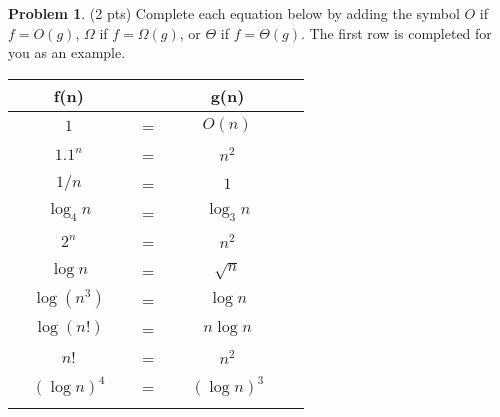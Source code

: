 \documentclass[12pt]{article}
\theoremstyle{definition}
\newtheorem{problem}{Problem}
\begin{document}
\newpage
\begin{problem}
(2 pts)
    Complete each equation below by adding the symbol $O$ if $f=O(g)$, $\Omega$ if $f=\Omega(g)$, or $\Theta$ if $f=\Theta(g)$.  
    The first row is completed for you as an example.

{\renewcommand{\arraystretch}{3.4}
\begin{tabular}{c c c c c c}
    & f(n) &~\hspace{0.5in}~$ $~\hspace{0.5in}~& g(n) &\\
    \hline
    & $1$ & ~\hspace{0.5in}~$=$~\hspace{0.5in}~  & $O(n)$ &  &\\
    \arrayrulecolor{gray}\hline
    & $1.1^n$ & ~\hspace{0.5in}~$=$~\hspace{0.5in}~  & $n^2$ &  &\\
    \arrayrulecolor{gray}\hline
    & $1/n$ & ~\hspace{0.5in}~$=$~\hspace{0.5in}~  & $1$ &  &\\
    \arrayrulecolor{gray}\hline
    & $\log_4 n$ & ~\hspace{0.5in}~$=$~\hspace{0.5in}~  & $\log_3 n$ &  &\\
    \arrayrulecolor{gray}\hline
    & $2^{n}$ & ~\hspace{0.5in}~$=$~\hspace{0.5in}~  & $n^2$ &  &\\
    \arrayrulecolor{gray}\hline
    & $\log n$ & ~\hspace{0.5in}~$=$~\hspace{0.5in}~  & $\sqrt n$ &  &\\
    \arrayrulecolor{gray}\hline
    & $\log (n^3)$ & ~\hspace{0.5in}~$=$~\hspace{0.5in}~  & $\log n$ &  &\\
    \arrayrulecolor{gray}\hline
    & $\log (n!)$ & ~\hspace{0.5in}~$=$~\hspace{0.5in}~  & $n\log n$ &  &\\
    \arrayrulecolor{gray}\hline
    & $n!$ & ~\hspace{0.5in}~$=$~\hspace{0.5in}~  & $n^2$ &  &\\
    \arrayrulecolor{gray}\hline
    & $(\log n)^4$ & ~\hspace{0.5in}~$=$~\hspace{0.5in}~  & $(\log n)^3$ &  &\\
    \arrayrulecolor{gray}\hline


\end{tabular}}
\end{problem}
\end{document}

